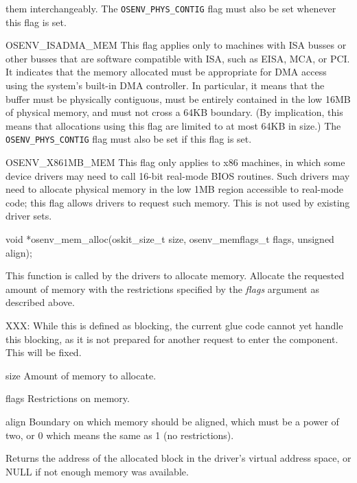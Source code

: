 \begin{apidesc}
\begin{icsymlist}
		them interchangeably.
		The {\tt OSENV_PHYS_CONTIG} flag must also be set
		whenever this flag is set.
	\item[OSENV_ISADMA_MEM]
		This flag applies only to machines with ISA busses
		or other busses that are software compatible with ISA,
		such as EISA, MCA, or PCI\@.
		It indicates that the memory allocated
		must be appropriate for DMA access
		using the system's built-in DMA controller.
		In particular, it means that the buffer
		must be physically contiguous,
		must be entirely contained in the low 16MB of physical memory,
		and must not cross a 64KB boundary.
		(By implication,
		this means that allocations using this flag
		are limited to at most 64KB in size.)
		The {\tt OSENV_PHYS_CONTIG} flag must also be set
		if this flag is set.
	\item[OSENV_X861MB_MEM]
		This flag only applies to x86 machines,
		in which some device drivers
		may need to call 16-bit real-mode BIOS routines.
		Such drivers may need to allocate physical memory
		in the low 1MB region accessible to real-mode code;
		this flag allows drivers to request such memory.
		This is not used by existing driver sets.
	\end{icsymlist}
\end{apidesc}

\begin{apisyn}
        \funcproto void *osenv_mem_alloc(oskit_size_t size, osenv_memflags_t flags,
				        unsigned align);
\end{apisyn}
\drvtoosb
\begin{apidesc}
	This function is called by the drivers to allocate memory.
	Allocate the requested amount of memory with the restrictions
	specified by the \emph{flags} argument as described above.

	XXX: While this is defined as blocking, the current glue
	code cannot yet handle this blocking, as it is not
	prepared for another request to enter the component.
	This will be fixed.

\end{apidesc}
\begin{apiparm}
	\item[size]
		Amount of memory to allocate.
	\item[flags]
		Restrictions on memory.
	\item[align]
		Boundary on which memory should be aligned,
		which must be a power of two,
		or 0 which means the same as 1 (no restrictions).
\end{apiparm}
\begin{apiret}
	Returns the address of the allocated block
	in the driver's virtual address space,
	or NULL if not enough memory was available.
\end{apiret}


